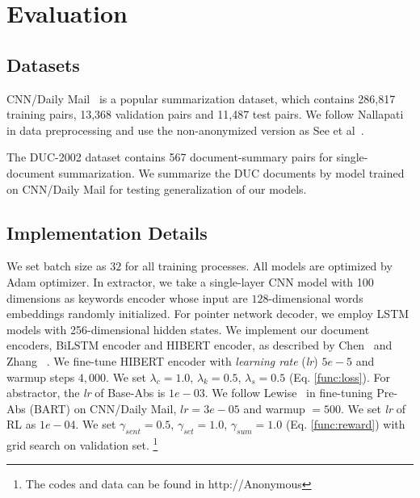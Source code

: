 \section{Evaluation}
\label{sec:eval}

\subsection{Datasets}
CNN/Daily Mail~\cite{HermannKGEKSB15}
is a popular summarization dataset, 
which contains 286,817 training pairs,
13,368 validation pairs and 11,487 test pairs.
We follow Nallapati~ in data preprocessing
and use the non-anonymized version as See et al~.

The DUC-2002 dataset contains 567 document-summary pairs for single-document summarization.
We summarize the DUC documents by model trained on CNN/Daily Mail
for testing generalization of our models.

\subsection{Implementation Details}
We set batch size as $32$ for all training processes.
All models are optimized by Adam optimizer.
In extractor, we take a single-layer CNN model with 100 dimensions
as keywords encoder whose input are $128$-dimensional words embeddings randomly initialized.
For pointer network decoder, we employ LSTM
models with 256-dimensional hidden states.
We implement our document encoders, BiLSTM encoder and HIBERT encoder,
as described by Chen~ and Zhang ~.
We fine-tune HIBERT encoder with {\em learning rate} ({\em lr}) $5e-5$ and warmup steps $4,000$.
We set $\lambda_{c}=1.0$, 
$\lambda_{k} = 0.5$,
$\lambda_{s} = 0.5$ (Eq. \ref{func:loss}).
For abstractor, the {\em lr} of Base-Abs is $1e-03$.
We follow Lewise~ in fine-tuning Pre-Abs (BART) 
on CNN/Daily Mail, $lr=3e-05$ and warmup $=500$.
We set {\em lr} of RL as $1e-04$. 
We set $\gamma_{sent}=0.5$, 
$\gamma_{set} = 1.0$,
$\gamma_{sum} = 1.0$ (Eq. \ref{func:reward}) with grid
search on validation set.
\footnote{The codes and data can be found in http://Anonymous}


